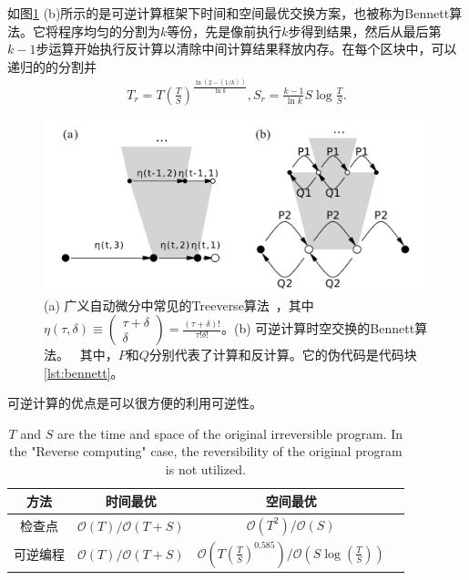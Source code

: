 \documentclass[A4,twoside,fontset=ubuntu,UTF8]{ctexart}
\newcommand{\bigO}{{\mathcal{O}}}
\begin{document}
如图\ref{fig:tradeoff} (b)所示的是可逆计算框架下时间和空间最优交换方案，也被称为Bennett算法。它将程序均匀的分割为$k$等份，先是像前执行$k$步得到结果，然后从最后第$k-1$步运算开始执行反计算以清除中间计算结果释放内存。在每个区块中，可以递归的的分割并
\begin{align}\label{eq:rev}
    T_r = T\left(\frac{T}{S}\right)^{\frac{\ln(2-(1/k))}{\ln k}}, S_r = \frac{k-1}{\ln k}S\log\frac{T}{S}.
\end{align}

\begin{figure}
    \centerline{\includegraphics[width=0.88\columnwidth,trim={0 0cm 0 0cm},clip]{tradeoff.pdf}}
    \caption{(a) 广义自动微分中常见的Treeverse算法~\cite{Griewank1992}，其中$\eta(\tau, \delta) \equiv \left(\begin{matrix} \tau + \delta \\ \delta \end{matrix}\right)=\frac{(\tau+\delta)!}{\tau!\delta!}$。(b) 可逆计算时空交换的Bennett算法。~\cite{Bennett1973,Levine1990} 其中，$P$和$Q$分别代表了计算和反计算。它的伪代码是代码块\ref{lst:bennett}。}\label{fig:tradeoff}
\end{figure}

可逆计算的优点是可以很方便的利用可逆性。


\begin{table}
    \centering
    \begin{tabularx}{0.6\textwidth}{cccc}\toprule
        \textbf{方法} & 时间最优 & 空间最优\\
        \hline
        检查点                           & $\bigO(T)/\bigO(T+S)$   & $\bigO(T^2)/\bigO(S)$   \\
        可逆编程  & $\bigO(T)/\bigO(T+S)$   & $\bigO(T(\frac{T}{S})^{0.585})/\bigO(S\log(\frac{T}{S}))$ \\
        \bottomrule
    \end{tabularx}
    \caption{$T$ and $S$ are the time and space of the original irreversible program. In the "Reverse computing" case, the reversibility of the original program is not utilized.}\label{tbl:timespace}
\end{table}
\end{document}
